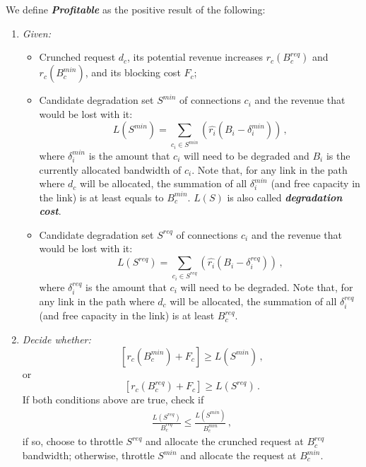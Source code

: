 \documentclass[journal]{IEEEtran}
\begin{document}
We define \textbf{\textit{Profitable}} as the positive result of the following:
\begin{enumerate}[label=\textit{\roman*.}]
 \item \textit{Given:}
 \begin{itemize}
 \item Crunched request $d_c$, its potential revenue increases $r_{c}(B_{c}^{req})$ and $r_{c}(B_{c}^{min})$, and its blocking cost $F_{c}$;
 \item Candidate degradation set $S^{min}$ of connections $c_i$ and the revenue that would be lost with it:
 $$L(S^{min}) = \sum\limits_{{c_i} \in S^{min}}\left(\widehat{r_{i}}(B_{i} - \delta^{min}_{i})\right)\,,$$ 
 where $\delta^{min}_{i}$ is the amount that $c_i$ will need to be degraded and $B_{i}$ is the currently allocated bandwidth of $c_i$. Note that, for any link in the path where $d_c$ will be allocated, the summation of all $\delta^{min}_{i}$ (and free capacity in the link) is at least equals to $B_{c}^{min}$. $L(S)$ is also called \textbf{\textit{degradation cost}}.
 \item Candidate degradation set $S^{req}$ of connections $c_i$ and the revenue that would be lost with it:
 $$L(S^{req}) = \sum\limits_{{c_i} \in S^{req}}\left(\widehat{r_{i}}(B_{i} - \delta^{req}_{i})\right)\,,$$ 
 where $\delta^{req}_{i}$ is the amount that $c_i$ will need to be degraded. Note that, for any link in the path where $d_c$ will be allocated, the summation of all $\delta^{req}_{i}$ (and free capacity in the link) is at least $B_{c}^{req}$.
 \end{itemize}
 \item \textit{Decide whether:} 
 $$\left[r_{c}(B_{c}^{min}) + F_{c}\right] \geq L(S^{min})\,,$$
 or
 $$\left[r_{c}(B_{c}^{req}) + F_{c}\right] \geq L(S^{req})\,.$$
 If both conditions above are true, check if
 \begin{align}
 \frac{L(S^{req})}{B_{c}^{req}} \leq \frac{L(S^{min})}{B_{c}^{min}}\,, \label{equation_revloss}
 \end{align}
 if so, choose to throttle $S^{req}$ and allocate the crunched request at $B_{c}^{req}$ bandwidth; otherwise, throttle $S^{min}$ and allocate the request at $B_{c}^{min}$.
\end{enumerate}
\end{document}
